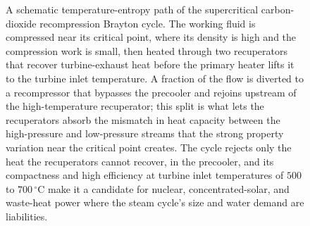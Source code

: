 \begin{figure}[htbp]
\caption[Supercritical CO$_2$ recompression Brayton cycle on the temperature-entropy
plane]{A schematic temperature-entropy path of the supercritical carbon-dioxide
recompression Brayton cycle. The working fluid is compressed near its critical
point, where its density is high and the compression work is small, then heated
through two recuperators that recover turbine-exhaust heat before the primary
heater lifts it to the turbine inlet temperature. A fraction of the flow is
diverted to a recompressor that bypasses the precooler and rejoins upstream of the
high-temperature recuperator; this split is what lets the recuperators absorb the
mismatch in heat capacity between the high-pressure and low-pressure streams that
the strong property variation near the critical point creates. The cycle rejects
only the heat the recuperators cannot recover, in the precooler, and its
compactness and high efficiency at turbine inlet temperatures of $500$ to
$700\,^{\circ}$C make it a candidate for nuclear, concentrated-solar, and
waste-heat power where the steam cycle's size and water demand are liabilities.}
\label{fig:vol04ch03:sco2-recompression-ts}
\end{figure}
